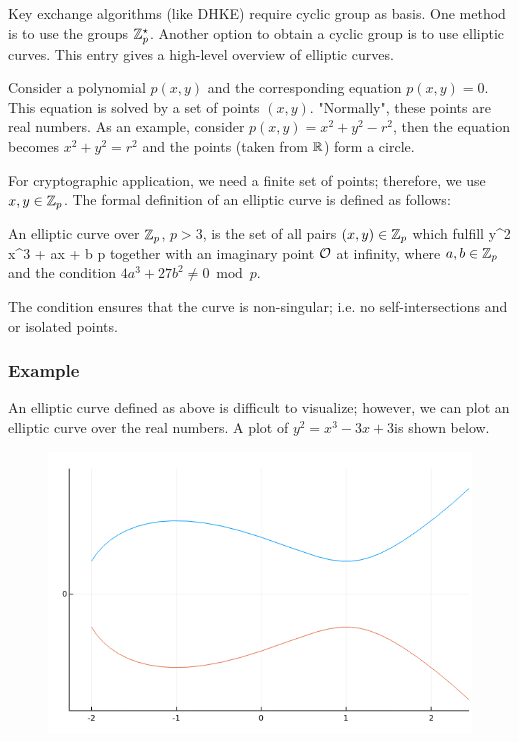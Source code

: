 
Key exchange algorithms (like DHKE) require cyclic group as basis. One method is to use the groups $\mathbb{Z}_p^\star$. Another option to obtain a cyclic group is to use elliptic curves. This entry gives a high-level overview of elliptic curves.

Consider a polynomial $p(x,y)$ and the corresponding equation $p(x,y) = 0$. This equation is solved by a set of points $(x,y)$. "Normally", these points are real numbers. As an example, consider $p(x,y) = x^2+y^2 - r^2$, then the equation becomes $x^2+y^2 = r^2$ and the points (taken from $\mathbb{R}$) form a circle.

For cryptographic application, we need a finite set of points; therefore, we use $x,y \in \mathbb{Z}_p$. The formal definition of an elliptic curve is defined as follows: 

\begin{definition}
	An elliptic curve over $\mathbb{Z}_p$, $p > 3$, is the set of all pairs $(x,y) \in \mathbb{Z}_p$ which fulfill
	\bee
	y^2 \equiv x^3 + ax + b \bmod p
	\eee
	together with an imaginary point $\mathcal{O}$ at infinity, where $a, b \in \mathbb{Z}_p$ and the condition $4a^3 + 27b^2 \neq 0 \bmod p$.
\end{definition}

The condition ensures that the curve is non-singular; i.e. no self-intersections and or isolated points.

\subsubsection{Example}

An elliptic curve defined as above is difficult to visualize; however, we can plot an elliptic curve over the real numbers. A plot of $y^2 = x^3-3x + 3$is shown below.

\begin{figure}[H]
	\includegraphics[scale=0.5]{images/elliptic_curves.png}
\end{figure}

